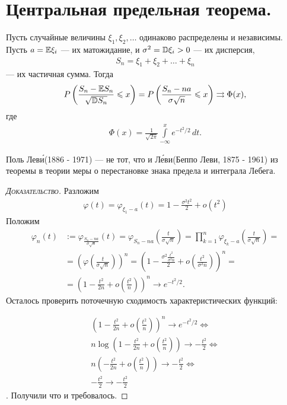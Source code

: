 \documentclass[../main.tex]{subfiles}
\begin{document}
\section{Центральная предельная теорема.}

\begin{thm}
 Пусть случайные величины $ \xi_1, \xi_2, \ldots $  одинаково распределены и независимы. Пусть $ a = \mathbb E \xi_i $ --- их матожидание, и  $ \sigma^{2} = \mathbb D \xi_i > 0 $  --- их дисперсия,
 \begin{align*}
  S_n = \xi_1 + \xi_2 + \ldots + \xi_n
 \end{align*} --- их частичная сумма. Тогда
 \begin{align*}
  P\left(\frac{S_n - \mathbb E S_n}{\sqrt{\mathbb D S_n}} \leqslant x\right) = P \left( \frac{S_n - na}{\sigma \sqrt n} \leqslant x \right) \rightrightarrows \Phi(x),
 \end{align*} где
 \begin{align*}
  \Phi(x) = \frac{1}{\sqrt{2\pi}} \int\limits_{-\infty}^{x} e^{-t^{2} / 2}\,dt.
 \end{align*}
\end{thm}
\begin{remrk*}
 Поль Лев\'{и}(1886 - 1971) --- не тот, что и Л\'{е}ви(Беппо Леви, 1875 - 1961) из теоремы в теории меры о перестановке знака предела и интеграла Лебега.
\end{remrk*}
\begin{proof}[\normalfont\textsc{Доказательство}]
 Разложим
 \begin{align*}
  \varphi(t) = \varphi_{\xi_1 - a}(t) = 1 - \frac{\sigma^{2}t^{2}}{2} + o(t^{2})
 \end{align*} Положим
 \begin{align*}
  \varphi_n(t) &:= \varphi_{\frac{S_n - na}{\sigma \sqrt n}}(t) = \varphi_{S_n - na} \left( \frac{t}{\sigma \sqrt n} \right) = \prod_{k=1}^{n} \varphi_{\xi_k - a} \left( \frac{t}{\sigma \sqrt n} \right) = \\
  &= \left(\varphi \left( \frac{t}{\sigma \sqrt n} \right) \right)^{n} = \left( 1- \frac{\sigma^{2} \frac{t^{2}}{\sigma^{2} n}}{2} + o \left( \frac{t^{2}}{\sigma^{2} n} \right) \right)^{n} = \\
  &= \left( 1 - \frac{t^{2}}{2n} + o \left( \frac{t^{2}}{n} \right) \right)^{n} \to e^{-t^{2} / 2}.
 \end{align*} Осталось проверить поточечную сходимость характеристических функций:

 \begin{align*}
	 \left(1 - \frac{t^2}{2n} + o\left(\frac{t^2}{n}\right)\right)^{n} \to e^{-t^2/2} \Longleftrightarrow \\
	 n \log \left(1 - \frac{t^2}{2n} + o\left(\frac{t^2}{n}\right)\right) \to - \frac{t^2}{2} \Longleftrightarrow \\
	 n \left(-\frac{t^2}{2n} + o\left(\frac{t^2}{n}\right)\right) \to -\frac{t^2}{2} \Longleftrightarrow \\
	 -\frac{t^2}{2} \to -\frac{t^2}{2}
 \end{align*}. Получили что и требовалось.

\end{proof}
\end{document}
